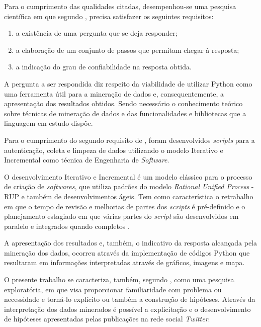 Para o cumprimento das qualidades citadas, desempenhou-se uma pesquisa científica em que segundo , precisa satisfazer os seguintes requisitos:

\begin{enumerate}
	\item a existência de uma pergunta que se deja responder;
	\item a elaboração de um conjunto de passos que permitam chegar à resposta;
	\item a indicação do grau de confiabilidade na resposta obtida.
\end{enumerate}

A pergunta a ser respondida diz respeito da viabilidade de utilizar Python como uma ferramenta útil para a mineração de dados e, consequentemente, a apresentação dos resultados obtidos. Sendo necessário o conhecimento teórico sobre técnicas de mineração de dados e das funcionalidades e bibliotecas que a linguagem em estudo dispõe.

Para o cumprimento do segundo requisito de , foram desenvolvidos \textit{scripts} para a autenticação, coleta e limpeza de dados utilizando o modelo Iterativo e Incremental como técnica de Engenharia de \textit{Software}.

O desenvolvimento Iterativo e Incremental é um modelo clássico para o processo de criação de \textit{softwares}, que utiliza padrões do modelo \textit{Rational Unified Process} - RUP e também de desenvolvimentos ágeis. Tem como característica o retrabalho em que o tempo de revisão e melhorias de partes dos \textit{scripts} é pré-definido e o planejamento estagiado em que várias partes do \textit{script} são desenvolvidos em paralelo e integrados quando completos \cite{rup}.

A apresentação dos resultados e, também, o indicativo da resposta alcançada pela mineração dos dados, ocorreu através da implementação de códigos Python que resultaram em informações interpretadas através de gráficos, imagens e mapa.

O presente trabalho se caracteriza, também, segundo , como uma pesquisa exploratória, em que visa proporcionar familiaridade com problema ou necessidade e torná-lo explícito ou também a construção de hipóteses. Através da interpretação dos dados minerados é possível a explicitação e o desenvolvimento de hipóteses apresentadas pelas publicações na rede social \textit{Twitter}.














